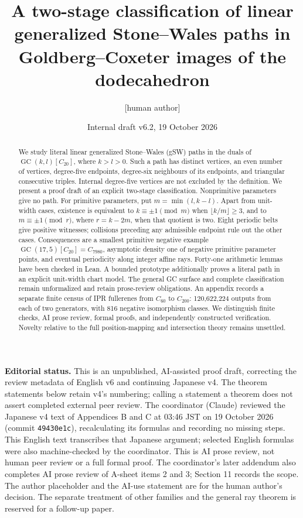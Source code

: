 \documentclass[11pt]{amsart}
\title[Two-stage classification of linear gSW paths]{A two-stage classification of linear generalized Stone--Wales paths in Goldberg--Coxeter images of the dodecahedron}
\author{[human author]}
\date{Internal draft v6.2, 19 October 2026}
\newcommand{\GC}{\operatorname{GC}}
\newcommand{\record}[1]{\nolinkurl{#1}}
\begin{document}
\begin{abstract}
We study literal linear generalized Stone--Wales (gSW) paths in the duals
of $\GC(k,l)[C_{20}]$, where $k>l>0$. Such a path has distinct vertices,
an even number of vertices, degree-five endpoints, degree-six neighbours
of its endpoints, and triangular consecutive triples. Internal
degree-five vertices are not excluded by the definition. We present a
proof draft of an explicit two-stage classification. Nonprimitive
parameters give no path. For primitive parameters, put $m=\min(l,k-l)$.
Apart from unit-width cases, existence is equivalent to $k\equiv\pm1
\pmod m$ when $\lfloor k/m\rfloor\ge3$, and to $m\equiv\pm1\pmod r$,
where $r=k-2m$, when that quotient is two. Eight periodic belts give
positive witnesses; collisions preceding any admissible endpoint rule
out the other cases. Consequences are a smallest primitive negative
example $\GC(17,5)[C_{20}]=C_{7980}$, asymptotic density one of negative
primitive parameter points, and eventual periodicity along integer
affine rays. Forty-one arithmetic lemmas have been checked in Lean. A bounded
prototype additionally proves a literal path in an explicit unit-width
chart model. The general GC surface and complete classification remain
unformalized and retain prose-review obligations. An appendix records a
separate finite census of IPR fullerenes from $C_{60}$ to $C_{200}$:
120,622,224 outputs from each of two generators, with 816 negative
isomorphism classes. We distinguish finite checks, AI prose review,
formal proofs, and independently constructed verification. Novelty
relative to the full position-mapping and intersection theory remains
unsettled.
\end{abstract}
\maketitle

\noindent\textbf{Editorial status.} This is an unpublished, AI-assisted
proof draft, correcting the review metadata of English v6 and continuing Japanese v4. The theorem statements below
retain v4's numbering; calling a statement a theorem does not assert
completed external peer review. The coordinator (Claude) reviewed the
Japanese v4 text of Appendices B and C at 03:46 JST on 19 October 2026
(commit \record{49430e1c}), recalculating its formulas and recording no
missing steps. This English text transcribes that Japanese argument;
selected English formulas were also machine-checked by the coordinator.
This is AI prose review, not human peer review or a full formal proof.
The coordinator's later addendum also completes AI prose review of A-sheet items 2 and 3; Section 11 records the scope. The author placeholder and the AI-use statement are
for the human author's decision. The separate treatment of other
families and the general ray theorem is reserved for a follow-up paper.
\end{document}
